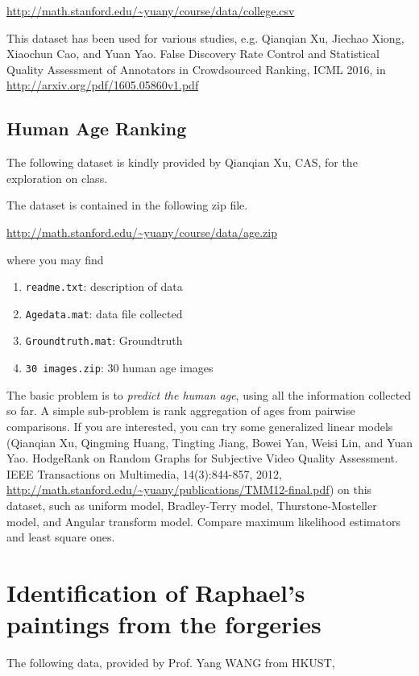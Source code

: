 \documentclass[11pt]{article}
\begin{document}
\url{http://math.stanford.edu/~yuany/course/data/college.csv}

This dataset has been used for various studies, e.g. Qianqian Xu, Jiechao Xiong, Xiaochun Cao, and Yuan Yao. False Discovery Rate Control and Statistical Quality Assessment of Annotators in Crowdsourced Ranking, ICML 2016, in \url{http://arxiv.org/pdf/1605.05860v1.pdf}

\subsection{Human Age Ranking}


The following dataset is kindly provided by Qianqian Xu, CAS, for the exploration on class. 

The dataset is contained in the following zip file.

\url{http://math.stanford.edu/~yuany/course/data/age.zip}

\noindent where you may find
\begin{enumerate}
\item \texttt{readme.txt}: description of data
\item \texttt{Agedata.mat}: data file collected
\item \texttt{Groundtruth.mat}: Groundtruth
\item \texttt{30 images.zip}: 30 human age images
\end{enumerate}

The basic problem is to \emph{predict the human age}, using all the information collected so far. A simple sub-problem is rank aggregation of ages from pairwise comparisons. If you are interested, you can try some generalized linear models (Qianqian Xu, Qingming Huang, Tingting Jiang, Bowei Yan, Weisi Lin, and Yuan Yao. HodgeRank on Random Graphs for Subjective Video Quality Assessment. IEEE Transactions on Multimedia, 14(3):844-857, 2012, \url{http://math.stanford.edu/~yuany/publications/TMM12-final.pdf}) on this dataset, such as uniform model, Bradley-Terry model, Thurstone-Mosteller model, and Angular transform model. Compare maximum likelihood estimators and least square ones. 

\section{Identification of Raphael's paintings from the forgeries}

The following data, provided by Prof. Yang WANG from HKUST,
\end{document}
